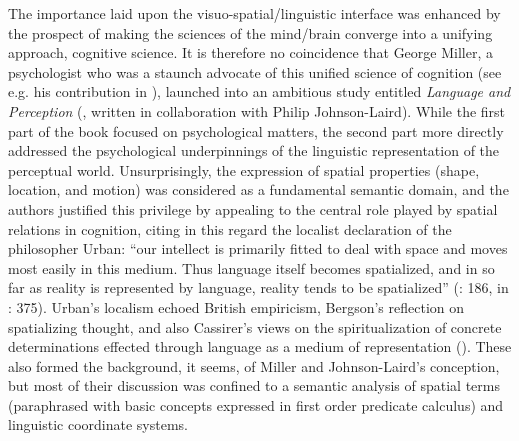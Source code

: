 \documentclass[output=paper]{langscibook}
\begin{document}
The importance laid upon the visuo-spatial\slash linguistic interface was enhanced by the prospect of making the sciences of the mind/brain converge into a unifying approach, cognitive science. It is therefore no coincidence that George Miller, a psychologist who was a staunch advocate of this unified science of cognition (see e.g. his contribution in \citealt{walker_report_1978}), launched into an ambitious study entitled \textit{Language and Perception} (\citeyear{miller_language_1976}, written in collaboration with Philip Johnson-Laird). While the first part of the book focused on psychological matters, the second part more directly addressed the psychological underpinnings of the linguistic representation of the perceptual world. Unsurprisingly, the expression of spatial properties (shape, location, and motion) was considered as a fundamental semantic domain, and the authors justified this privilege by appealing to the central role played by spatial relations in cognition, citing in this regard the localist declaration of the philosopher Urban: “our intellect is primarily fitted to deal with space and moves most easily in this medium. Thus language itself becomes spatialized, and in so far as reality is represented by language, reality tends to be spatialized” (\citealt{urban_language_1939}: 186, in \citealt{miller_language_1976}: 375). Urban’s localism echoed British empiricism, Bergson’s reflection on spatializing thought, and also Cassirer’s views on the spiritualization of concrete determinations effected through language as a medium of representation (\citealt{cassirer_philosophie_1923}). These also formed the background, it seems, of Miller and Johnson-Laird’s conception, but most of their discussion was confined to a semantic analysis of spatial terms (paraphrased with basic concepts expressed in first order predicate calculus) and linguistic coordinate systems.
\end{document}
